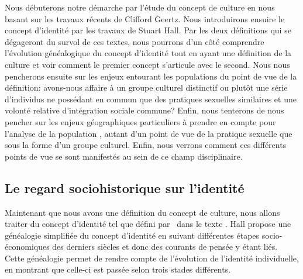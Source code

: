 Nous débuterons notre démarche par l'étude du concept de culture en nous basant sur les travaux récents de Clifford Geertz. 
Nous introduirons ensuire le concept d'identité par les travaux de Stuart Hall. 
Par les deux définitions qui se dégageront du survol de ces textes, nous pourrons d'un côté comprendre l'évolution généalogique du concept d'identité tout en ayant une définition de la culture et voir comment le premier concept s'articule avec le second. 
Nous nous pencherons ensuite sur les enjeux entourant les populations \lgbt{} du point de vue de la définition: avons-nous affaire à un groupe culturel distinctif ou plutôt une série d'individus ne possédant en commun que des pratiques sexuelles similaires et une volonté relative d'intégration sociale commune? 
Enfin, nous tenterons de nous pencher sur les enjeux géographiques particuliers à prendre en compte pour l'analyse de la population \lgbt{}, autant d'un point de vue de la pratique sexuelle que sous la forme d'un groupe culturel. 
Enfin, nous verrons comment ces différents points de vue se sont manifestés au sein de ce champ disciplinaire.


\subsection{Le regard sociohistorique sur l'identité}
\label{sec:le_regard_sociohistoirique_sur_l_identit_} Maintenant que nous avons une définition du concept de culture, nous allons traiter du concept d'identité tel que défini par~\citet{Hall1996a} dans le texte . 
Hall propose une généalogie simplifiée du concept d'identité en suivant différentes étapes socio-économiques des derniers siècles et donc des courants de pensée y étant liés. 
Cette généalogie permet de rendre compte de l'évolution de l'identité individuelle, en montrant que celle-ci est passée selon trois stades différents.

